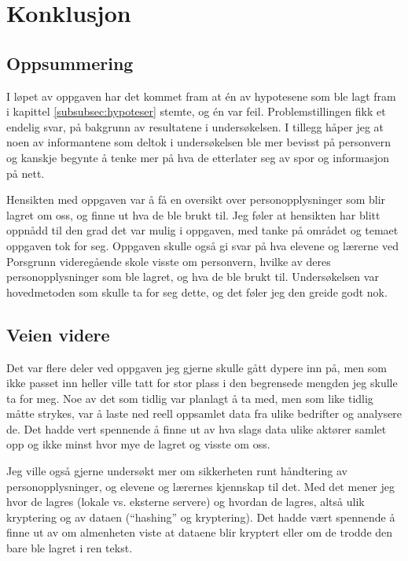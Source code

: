 \section{Konklusjon}

\subsection{Oppsummering}
I løpet av oppgaven har det kommet fram at én av hypotesene som ble lagt fram i kapittel \ref{subsubsec:hypoteser} stemte, og én var feil. Problemstillingen fikk et endelig svar, på bakgrunn av resultatene i undersøkelsen. I tillegg håper jeg at noen av informantene som deltok i undersøkelsen ble mer bevisst på personvern og kanskje begynte å tenke mer på hva de etterlater seg av spor og informasjon på nett.

Hensikten med oppgaven var å få en oversikt over personopplysninger som blir lagret om oss, og finne ut hva de ble brukt til. Jeg føler at hensikten har blitt oppnådd til den grad det var mulig i oppgaven, med tanke på området og temaet oppgaven tok for seg. Oppgaven skulle også gi svar på hva elevene og lærerne ved Porsgrunn videregående skole visste om personvern, hvilke av deres personopplysninger som ble lagret, og hva de ble brukt til. Undersøkelsen var hovedmetoden som skulle ta for seg dette, og det føler jeg den greide godt nok.

\subsection{Veien videre}
Det var flere deler ved oppgaven jeg gjerne skulle gått dypere inn på, men som ikke passet inn heller ville tatt for stor plass i den begrensede mengden jeg skulle ta for meg. Noe av det som tidlig var planlagt å ta med, men som like tidlig måtte strykes, var å laste ned reell oppsamlet data fra ulike bedrifter og analysere de. Det hadde vert spennende å finne ut av hva slags data ulike aktører samlet opp og ikke minst hvor mye de lagret og visste om oss.

Jeg ville også gjerne undersøkt mer om sikkerheten runt håndtering av personopplysninger, og elevene og lærernes kjennskap til det. Med det mener jeg hvor de lagres (lokale vs. eksterne servere) og hvordan de lagres, altså ulik kryptering og av dataen (``hashing'' og kryptering). Det hadde vært spennende å finne ut av om almenheten viste at dataene blir kryptert eller om de trodde den bare ble lagret i ren tekst.

\newpage
